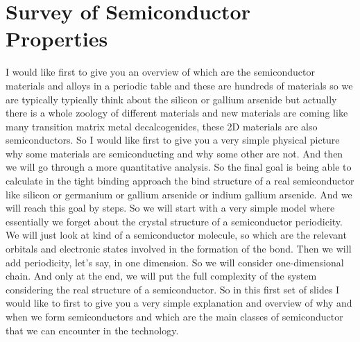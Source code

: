 \section{Survey of Semiconductor Properties}
I would like first to give you an overview of which are the semiconductor materials and alloys in a periodic table and these are hundreds of materials so we are typically typically think about the silicon or gallium arsenide but actually there is a whole zoology of different materials and new materials are coming like many transition matrix metal decalcogenides, these 2D materials are also semiconductors. So I would like first to give you a very simple physical picture why some materials are semiconducting and why some other are not. And then we will go through a more quantitative analysis. So the final goal is being able to calculate in the tight binding approach the bind structure of a real semiconductor like silicon or germanium or gallium arsenide or indium gallium arsenide. And we will reach this goal by steps. So we will start with a very simple model where essentially we forget about the crystal structure of a semiconductor periodicity. We will just look at kind of a semiconductor molecule, so which are the relevant orbitals and electronic states involved in the formation of the bond. Then we will add periodicity, let's say, in one dimension. So we will consider one-dimensional chain. And only at the end, we will put the full complexity of the system considering the real structure of a semiconductor. So in this first set of slides I would like to first to give you a very simple explanation and overview of why and when we form semiconductors and which are the main classes of semiconductor that we can encounter in the technology.\\
